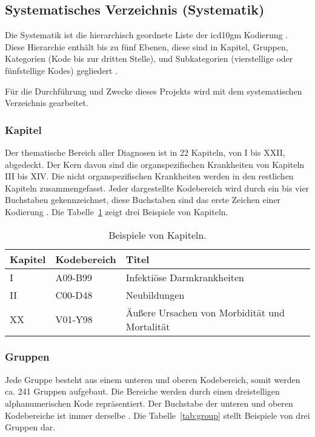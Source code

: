 \subsection{Systematisches Verzeichnis (Systematik)} \label{subsec:sistematic}

Die Systematik ist die hierarchisch geordnete Liste der \ac{icd10gm} Kodierung \cite{icd10syst}. Diese Hierarchie enthält bis zu fünf Ebenen, diese sind in Kapitel, Gruppen, Kategorien (Kode bis zur dritten Stelle), und Subkategorien (vierstellige oder fünfstellige Kodes) gegliedert \cite{icd10systauf}.

Für die Durchführung und Zwecke dieses Projekts wird mit dem systematischen Verzeichnis gearbeitet.

\subsubsection{Kapitel} \label{subsubsec:chapters}

Der thematische Bereich aller Diagnosen ist in 22 Kapiteln, von I bis XXII, abgedeckt. Der Kern davon sind die organspezifischen Krankheiten von Kapiteln III bis XIV. Die nicht organspezifischen Krankheiten werden in den restlichen Kapiteln zusammengefasst. Jeder dargestellte Kodebereich wird durch ein bis vier Buchstaben gekennzeichnet, diese Buchstaben sind das erste Zeichen einer Kodierung \cite{icd10systauf}. Die Tabelle~\ref{tab:chapter} zeigt drei Beispiele von Kapiteln.

\begin{table}[ht]
	\centering
	\small
	\caption{Beispiele von Kapiteln.}
	\label{tab:chapter}
	\begin{tabular}{|l|l|p{8cm}|}
		\hline
		\rowcolor{lightgray} Kapitel & Kodebereich & Titel \\
		\hline 
		I &  \textsf{A09-B99} & Infektiöse Darmkrankheiten \\ \hline
		II &  \textsf{C00-D48} & Neubildungen \\ \hline
		XX &  \textsf{V01-Y98} & Äußere Ursachen von Morbidität und Mortalität \\ \hline
	\end{tabular}
\end{table}

\subsubsection{Gruppen} \label{subsubsec:groups}

Jede Gruppe besteht aus einem unteren und oberen Kodebereich, somit werden ca. 241 Gruppen aufgebaut. Die Bereiche werden durch einen dreistelligen alphanumerischen Kode repräsentiert. Der Buchstabe der unteren und oberen Kodebereiche ist immer derselbe \cite{icd10systauf}. Die Tabelle~\ref{tab:group} stellt Beispiele von drei Gruppen dar.


